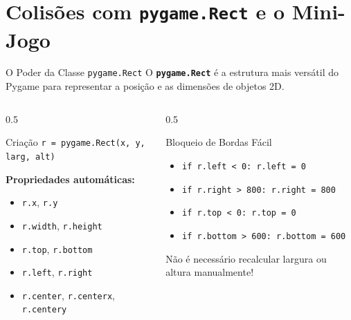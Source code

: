 \section{Colisões com \texttt{pygame.Rect} e o Mini-Jogo}

\begin{frame}{O Poder da Classe \texttt{pygame.Rect}}
    O \textbf{\texttt{pygame.Rect}} é a estrutura mais versátil do Pygame para representar a posição e as dimensões de objetos 2D.

    \vspace{0.3cm}
    \begin{columns}
        \begin{column}{0.5\textwidth}
            \begin{block}{Criação}
                \texttt{r = pygame.Rect(x, y, larg, alt)}
            \end{block}
            \textbf{Propriedades automáticas:}
            \begin{itemize}
                \item \texttt{r.x}, \texttt{r.y}
                \item \texttt{r.width}, \texttt{r.height}
                \item \texttt{r.top}, \texttt{r.bottom}
                \item \texttt{r.left}, \texttt{r.right}
                \item \texttt{r.center}, \texttt{r.centerx}, \texttt{r.centery}
            \end{itemize}
        \end{column}
        \begin{column}{0.5\textwidth}
            \begin{exampleblock}{Bloqueio de Bordas Fácil}
                \begin{itemize}
                    \item \texttt{if r.left < 0: r.left = 0}
                    \item \texttt{if r.right > 800: r.right = 800}
                    \item \texttt{if r.top < 0: r.top = 0}
                    \item \texttt{if r.bottom > 600: r.bottom = 600}
                \end{itemize}
                \small{Não é necessário recalcular largura ou altura manualmente!}
            \end{exampleblock}
        \end{column}
    \end{columns}
\end{frame}

